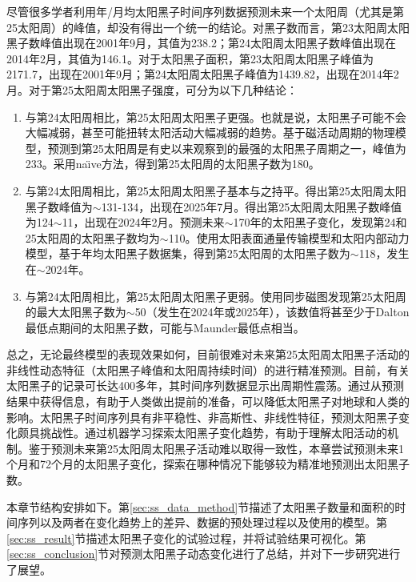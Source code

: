 尽管很多学者利用年/月均太阳黑子时间序列数据预测未来一个太阳周（尤其是第25太阳周）的峰值，却没有得出一个统一的结论。对黑子数而言，第23太阳周太阳黑子数峰值出现在2001年9月，其值为238.2；第24太阳周太阳黑子数峰值出现在2014年2月，其值为146.1。对于太阳黑子面积，第23太阳周太阳黑子峰值为2171.7，出现在2001年9月；第24太阳周太阳黑子峰值为1439.82，出现在2014年2月。对于第25太阳周太阳黑子强度，可分为以下几种结论：
\begin{enumerate}
  \item 与第24太阳周相比，第25太阳周太阳黑子更强。也就是说，太阳黑子可能不会大幅减弱，甚至可能扭转太阳活动大幅减弱的趋势。\citet{mcintosh2020overlapping}基于磁活动周期的物理模型，预测到第25太阳周是有史以来观察到的最强的太阳黑子周期之一，峰值为233。\citet{pesnell2018effects}采用na{\"\i}ve方法，得到第25太阳周的太阳黑子数为180。
  \item 与第24太阳周相比，第25太阳周太阳黑子基本与之持平。\citet{bisoi2020another}得出第25太阳周太阳黑子数峰值为$\sim$131-134，出现在2025年7月。\citet{singh2019prediction}得出第25太阳周太阳黑子数峰值为124$\sim$11，出现在2024年2月。\citet{hiremath2008prediction}预测未来$\sim$170年的太阳黑子变化，发现第24和25太阳周的太阳黑子数均为$\sim$110。\citet{bhowmik2018prediction}使用太阳表面通量传输模型和太阳内部动力模型，基于年均太阳黑子数据集，得到第25太阳周的太阳黑子数为$\sim$118，发生在$\sim$2024年。
  \item 与第24太阳周相比，第25太阳周太阳黑子更弱。\citep{kitiashvili2020application}使用同步磁图发现第25太阳周的最大太阳黑子数为$\sim$50（发生在2024年或2025年），该数值将甚至少于Dalton最低点期间的太阳黑子数，可能与Maunder最低点相当。
\end{enumerate}

总之，无论最终模型的表现效果如何，目前很难对未来第25太阳周太阳黑子活动的非线性动态特征（太阳黑子峰值和太阳周持续时间）的进行精准预测。目前，有关太阳黑子的记录可长达400多年，其时间序列数据显示出周期性震荡。通过从预测结果中获得信息，有助于人类做出提前的准备，可以降低太阳黑子对地球和人类的影响。太阳黑子时间序列具有非平稳性、非高斯性、非线性特征，预测太阳黑子变化颇具挑战性。通过机器学习探索太阳黑子变化趋势，有助于理解太阳活动的机制。鉴于预测未来第25太阳周太阳黑子活动难以取得一致性，本章尝试预测未来1个月和72个月的太阳黑子变化，探索在哪种情况下能够较为精准地预测出太阳黑子数。

本章节结构安排如下。第\ref{sec:ss_data_method}节描述了太阳黑子数量和面积的时间序列以及两者在变化趋势上的差异、数据的预处理过程以及使用的模型。第\ref{sec:ss_result}节描述太阳黑子变化的试验过程，并将试验结果可视化。第\ref{sec:ss_conclusion}节对预测太阳黑子动态变化进行了总结，并对下一步研究进行了展望。

